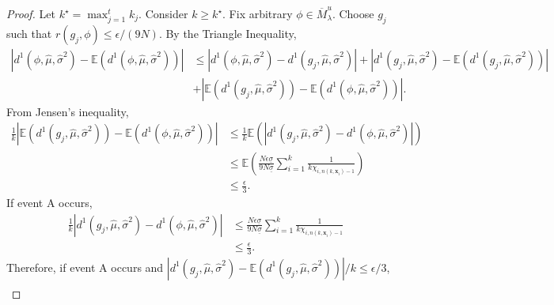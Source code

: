 \documentclass[10pt,a4paper]{amsart}
\newcommand{\des}{\ensuremath{\bm{x}}}
\begin{document}
\begin{proof}
    Let $k^\star=\max_{j=1}^t k_j$. Consider $k\geq k^\star$. Fix arbitrary $\phi \in \overline{M}^u_\lambda$. Choose $g_j$ such that $r(g_j,\phi)\leq \epsilon/(9N)$. By the Triangle Inequality,
    \begin{equation*}
        \begin{split}
           \left |d^1(\phi,\hat{\mu},\hat{\sigma}^2)-\mathbb{E}\left ( d^1(\phi,\hat{\mu},\hat{\sigma}^2)\right )\right |&\leq \left |d^1(\phi,\hat{\mu},\hat{\sigma}^2)-d^1(g_j,\hat{\mu},\hat{\sigma}^2) \right | +\left | d^1(g_j,\hat{\mu},\hat{\sigma}^2)-\mathbb{E}\left ( d^1(g_j,\hat{\mu},\hat{\sigma}^2)\right ) \right |\\
           & +\left |\mathbb{E}\left ( d^1(g_j,\hat{\mu},\hat{\sigma}^2)\right )-\mathbb{E}\left ( d^1(\phi,\hat{\mu},\hat{\sigma}^2)\right ) \right |.
        \end{split}
    \end{equation*}
    From Jensen's inequality,
    \begin{equation*}
        \begin{split}
            \frac{1}{k}\left |\mathbb{E}\left ( d^1(g_j,\hat{\mu},\hat{\sigma}^2)\right )-\mathbb{E}\left ( d^1(\phi,\hat{\mu},\hat{\sigma}^2)\right ) \right |&\leq  \frac{1}{k}\mathbb{E}\left (\left | d^1(g_j,\hat{\mu},\hat{\sigma}^2)- d^1(\phi,\hat{\mu},\hat{\sigma}^2) \right |\right )\\
            &\leq \mathbb{E}\left ( \frac{N\epsilon\underline{\sigma}}{9N\underline{\sigma}}\sum_{i=1}^k\frac{1}{k\chi_{i,n(k,\des_i)-1}} \right )\\
            &\leq \frac{\epsilon}{3}.
        \end{split}
    \end{equation*}
    If event A occurs, 
    \begin{equation*}
        \begin{split}
             \frac{1}{k}\left | d^1(g_j,\hat{\mu},\hat{\sigma}^2)- d^1(\phi,\hat{\mu},\hat{\sigma}^2) \right |& \leq  \frac{N\epsilon\underline{\sigma}}{9N\underline{\sigma}}\sum_{i=1}^k\frac{1}{k\chi_{i,n(k,\des_i)-1}} \\
            & \leq \frac{\epsilon}{3}.
        \end{split}
    \end{equation*}
    Therefore, if event A occurs and $\left | d^1(g_j,\hat{\mu},\hat{\sigma}^2)-\mathbb{E}\left ( d^1(g_j,\hat{\mu},\hat{\sigma}^2)\right ) \right |/k\leq \epsilon/3$,
    \begin{equation*}
        \begin{split}

\end{split}
\end{equation*}
\end{proof}
\end{document}
